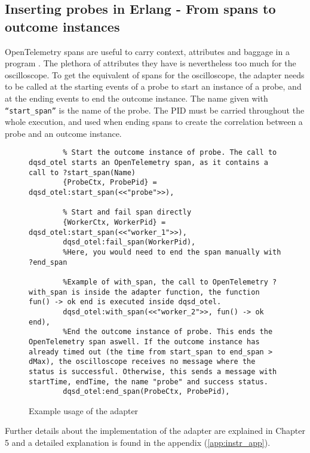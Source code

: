     \subsection{Inserting probes in Erlang - From spans to outcome instances}
        OpenTelemetry spans are useful to carry context, attributes and baggage in a program \cite{otel-dt}. The plethora of attributes they have is nevertheless too much for the oscilloscope. 
        To get the equivalent of spans for the oscilloscope, the adapter needs to be called at the starting events of a probe to start an instance of a probe, and at the ending events to end the outcome instance. The name given with \texttt{``start\_span''} is the name of the probe. The PID must be carried throughout the whole execution, and used when ending spans to create the correlation between a probe and an outcome instance.
\begin{figure}[H]
\centering
   \begin{verbatim}
        % Start the outcome instance of probe. The call to dqsd_otel starts an OpenTelemetry span, as it contains a call to ?start_span(Name)
        {ProbeCtx, ProbePid} = dqsd_otel:start_span(<<"probe">>),  

        % Start and fail span directly
        {WorkerCtx, WorkerPid} = dqsd_otel:start_span(<<"worker_1">>),   
        dqsd_otel:fail_span(WorkerPid),
        %Here, you would need to end the span manually with ?end_span

        %Example of with_span, the call to OpenTelemetry ?with_span is inside the adapter function, the function fun() -> ok end is executed inside dqsd_otel.
        dqsd_otel:with_span(<<"worker_2">>, fun() -> ok end), 
        %End the outcome instance of probe. This ends the OpenTelemetry span aswell. If the outcome instance has already timed out (the time from start_span to end_span > dMax), the oscilloscope receives no message where the status is successful. Otherwise, this sends a message with startTime, endTime, the name "probe" and success status.
        dqsd_otel:end_span(ProbeCtx, ProbePid),
        \end{verbatim}
\caption{Example usage of the adapter}\label{code:adapter}
\end{figure}
    Further details about the implementation of the adapter are explained in Chapter 5 and a detailed explanation is found in the appendix (\cref{app:instr_app}). 

